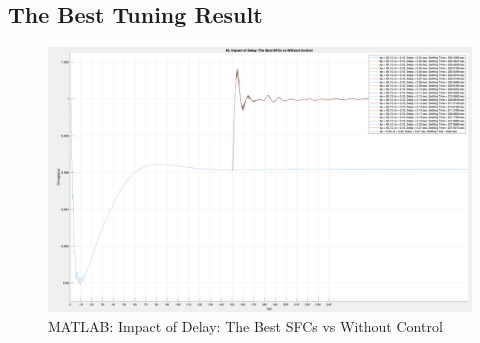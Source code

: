 \subsection{The Best Tuning Result} %
\begin{figure}[htbp]
\centering
\includegraphics[width = .819\textwidth]{figure/5_4_2.png}
\caption{MATLAB: Impact of Delay: The Best SFCs vs Without Control}
\label{5_4_2}
\end{figure}